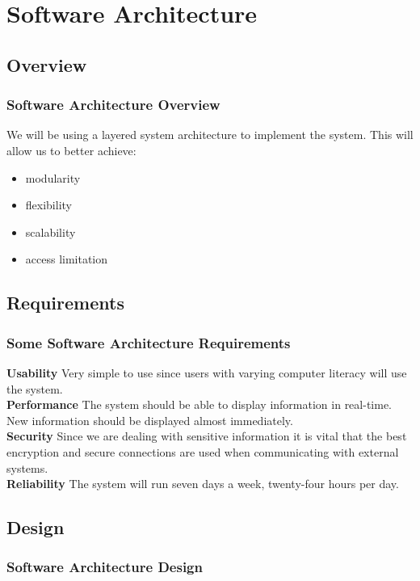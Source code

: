 \documentclass{beamer}
\begin{document}
\section{Software Architecture}
	\subsection{Overview}
		\begin{frame}
		\frametitle{Software Architecture Overview}
			We will be using a layered system architecture to implement the system. This will allow us to better achieve:
			\begin{itemize}
				\item modularity
				\item flexibility
				\item scalability
				\item access limitation
			\end{itemize}
		\end{frame}
		
	\subsection{Requirements}
		\begin{frame}
		\frametitle{Some Software Architecture Requirements}
			\textbf{Usability} Very simple to use since users with varying computer literacy will use the system.\\
			\textbf{Performance} The system should be able to display information in real-time. New information should be displayed almost immediately.\\
			\textbf{Security} Since we are dealing with sensitive information it is vital that the best encryption and secure connections are used when communicating with external systems.\\
			\textbf{Reliability} The system will run seven days a week, twenty-four hours per day.
		\end{frame}
		
	\subsection{Design}
		\begin{frame}
		\frametitle{Software Architecture Design}
		
		\end{frame}
		
\end{document}
